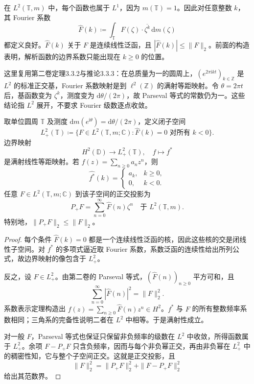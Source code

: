 在 \(L^2(\mathbb T,m)\) 中，每个函数也属于 \(L^1\)，因为 \(m(\mathbb T)=1\)。因此对任意整数 \(k\)，其 Fourier 系数
\[
 \widehat F(k)\coloneqq
 \int_{\mathbb T}F(\zeta)\cdot\overline{\zeta^k}\,\mathrm dm(\zeta)
\]
都定义良好。\(\widehat F(k)\) 关于 \(F\) 是连续线性泛函，且 \(|\widehat F(k)|\le\|F\|_2\)。前面的构造表明，解析函数的边界系数只能出现在 \(k\ge0\) 的位置。

\ProseParagraphBreak
这里复用第二卷定理3.3.2与推论3.3.3：在总质量为一的圆周上，\((e^{2\pi\mathrm i kt})_{k\in\mathbb Z}\) 是 \(L^2\) 的标准正交基，Fourier 系数映射是到 \(\ell^2(\mathbb Z)\) 的满射等距映射。令 \(\theta=2\pi t\) 后，基函数变为 \(\zeta^k\)，测度变为 \(\mathrm d\theta/(2\pi)\)，故 Parseval 等式的常数仍为一。这些结论指 \(L^2\) 展开，不要求 Fourier 级数逐点收敛。

\begin{proposition}[边界函数的频率刻画]\label{b3:prop:28-hardy-boundary-range}
取单位圆周 \(\mathbb T\) 及测度 \(\mathrm dm(e^{\mathrm i\theta})=\mathrm d\theta/(2\pi)\)，定义闭子空间
\[
 L^2_+(\mathbb T)\coloneqq
 \{F\in L^2(\mathbb T,m;\mathbb C):\widehat F(k)=0\text{ 对所有 }k<0\}.
\]
边界映射
\[
 H^2(\mathbb D)\longrightarrow L^2_+(\mathbb T),
 \quad f\longmapsto f^*
\]
是满射线性等距映射。若 \(f(z)=\sum_{n\ge0}a_nz^n\)，则
\[
 \widehat{f^*}(k)=
 \begin{cases}a_k,&k\ge0,\\0,&k<0.\end{cases}
\]
任意 \(F\in L^2(\mathbb T,m;\mathbb C)\) 到该子空间的正交投影为
\[
 P_+F=\sum_{n=0}^{\infty}\widehat F(n)\zeta^n
 \quad\text{于 }L^2(\mathbb T,m).
\]
特别地，\(\|P_+F\|_2\le\|F\|_2\)。
\end{proposition}
\begin{proof}
每个条件 \(\widehat F(k)=0\) 都是一个连续线性泛函的核，因此这些核的交是闭线性子空间。对 \(f^*\) 的多项式逼近取 Fourier 系数，系数泛函的连续性给出所列公式，故边界映射的像包含于 \(L^2_+\)。

反之，设 \(F\in L^2_+\)。由第二卷的 Parseval 等式，\((\widehat F(n))_{n\ge0}\) 平方可和，且
\[
 \sum_{n=0}^{\infty}|\widehat F(n)|^2=\|F\|_2^2.
\]
系数表示定理构造出 \(f(z)=\sum_{n\ge0}\widehat F(n)z^n\in H^2\)。\(f^*\) 与 \(F\) 的所有整数频率系数相同；三角系的完备性说明二者在 \(L^2\) 中相等。于是满射性成立。

对一般 \(F\)，Parseval 等式也保证只保留非负频率的级数在 \(L^2\) 中收敛，所得函数属于 \(L^2_+\)。余项 \(F-P_+F\) 只含负频率，因而与每个非负幂正交，再由非负幂在 \(L^2_+\) 中的稠密性知，它与整个子空间正交。这就是正交投影，且
\[
 \|F\|_2^2=\|P_+F\|_2^2+\|F-P_+F\|_2^2
\]
给出其范数界。
\end{proof}

